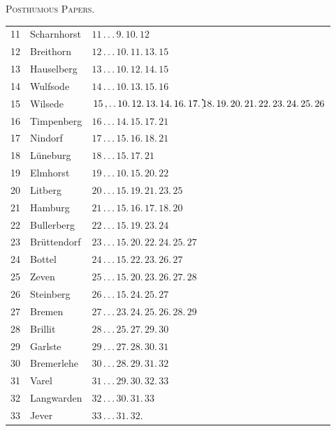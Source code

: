 \clearpage
{}\hfill\textsc{Posthumous Papers.}\hfill\mbox{}\par\bigskip
\noindent
\begin{tabular}{r|l|l}
11&Scharnhorst&$11\,.\,.\,.\,9.\,10.\,12$\\
12&Breithorn&$12\,.\,.\,.\,10.\,11.\,13.\,15$\\
13&Hauselberg&$13\,.\,.\,.\,10.\,12.\,14.\,15$\\
14&Wulfsode&$14\,.\,.\,.\,10.\,13.\,15.\,16$\\
15&Wilsede&$15\,{,}\,.\,.\,10.\,12.\,13.\,14.\,16.\,17.\,\tikz[baseline=0pt,x=1em,y=1em]{\fill (0,.65) rectangle (.12,.79);\draw[line width=.5pt] (0,-.12)..controls(.08,-.15)..(.15,-.12);}\!18.\,19.\,20.\,21.\,22.\,23.\,24.\,25.\,26$\\
16&Timpenberg&$16\,.\,.\,.\,14.\,15.\,17.\,21$\\
17&Nindorf&$17\,.\,.\,.\,15.\,16.\,18.\,21$\\
18&Lüneburg&$18\,.\,.\,.\,15.\,17.\,21$\\
19&Elmhorst&$19\,.\,.\,.\,10.\,15.\,20.\,22$\\
20&Litberg&$20\,.\,.\,.\,15.\,19.\,21.\,23.\,25$\\
21&Hamburg&$21\,.\,.\,.\,15.\,16.\,17.\,18.\,20$\\
22&Bullerberg&$22\,.\,.\,.\,15.\,19.\,23.\,24$\\
23&Brüttendorf&$23\,.\,.\,.\,15.\,20.\,22.\,24.\,25.\,27$\\
24&Bottel&$24\,.\,.\,.\,15.\,22.\,23.\,26.\,27$\\
25&Zeven&$25\,.\,.\,.\,15.\,20.\,23.\,26.\,27.\,28$\\
26&Steinberg&$26\,.\,.\,.\,15.\,24.\,25.\,27$\\
27&Bremen&$27\,.\,.\,.\,23.\,24.\,25.\,26.\,28.\,29$\\
28&Brillit&$28\,.\,.\,.\,25.\,27.\,29.\,30$\\
29&Garlste&$29\,.\,.\,.\,27.\,28.\,30.\,31$\\
30&Bremerlehe&$30\,.\,.\,.\,28.\,29.\,31.\,32$\\
31&Varel&$31\,.\,.\,.\,29.\,30.\,32.\,33$\\
32&Langwarden&$32\,.\,.\,.\,30.\,31.\,33$\\
33&Jever&$33\,.\,.\,.\,31.\,32.$
\end{tabular}

